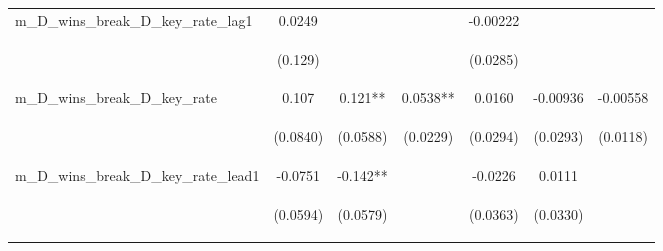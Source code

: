 \documentclass[]{article}
\begin{document}
\begin{center}
\begin{tabular}{lcccccc}
m\_D\_wins\_break\_D\_key\_rate\_lag1 & 0.0249 &  &  & -0.00222 &  &  \\
\vspace{4pt} & \begin{footnotesize}(0.129)\end{footnotesize} & \begin{footnotesize}\end{footnotesize} & \begin{footnotesize}\end{footnotesize} & \begin{footnotesize}(0.0285)\end{footnotesize} & \begin{footnotesize}\end{footnotesize} & \begin{footnotesize}\end{footnotesize} \\
m\_D\_wins\_break\_D\_key\_rate & 0.107 & 0.121** & 0.0538** & 0.0160 & -0.00936 & -0.00558 \\
\vspace{4pt} & \begin{footnotesize}(0.0840)\end{footnotesize} & \begin{footnotesize}(0.0588)\end{footnotesize} & \begin{footnotesize}(0.0229)\end{footnotesize} & \begin{footnotesize}(0.0294)\end{footnotesize} & \begin{footnotesize}(0.0293)\end{footnotesize} & \begin{footnotesize}(0.0118)\end{footnotesize} \\
m\_D\_wins\_break\_D\_key\_rate\_lead1 & -0.0751 & -0.142** &  & -0.0226 & 0.0111 &  \\
\vspace{4pt} & \begin{footnotesize}(0.0594)\end{footnotesize} & \begin{footnotesize}(0.0579)\end{footnotesize} & \begin{footnotesize}\end{footnotesize} & \begin{footnotesize}(0.0363)\end{footnotesize} & \begin{footnotesize}(0.0330)\end{footnotesize} & \begin{footnotesize}\end{footnotesize} \\

\end{tabular}
\end{center}
\end{document}
